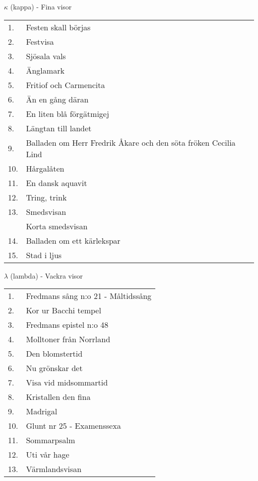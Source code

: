 \documentclass[a6paper,10pt]{article}
\begin{document}
\newpage
\noindent
\Large $\kappa$ (kappa) - Fina visor
\vspace{-5pt}
\begin{table}[!h]
\begin{tabularx}{1\textwidth}{l X}
1.&Festen skall börjas\\
2.&Festvisa\\
3.&Sjösala vals\\
4.&Änglamark\\
5.&Fritiof och Carmencita\\
6.&Än en gång däran\\
7.&En liten blå förgätmigej\\
8.&Längtan till landet\\
9.&Balladen om Herr Fredrik Åkare och den söta fröken Cecilia
Lind\\
10.&Hårgalåten\\
11.&En dansk aquavit\\
12.&Tring, trink\\
13.&Smedsvisan\\
&Korta smedsvisan\\
14.&Balladen om ett kärlekspar\\
15.&Stad i ljus
\end{tabularx}
\end{table}
\newpage
\noindent
\Large $\lambda$ (lambda) - Vackra visor
\vspace{-5pt}
\begin{table}[!h]
\begin{tabularx}{1\textwidth}{l X}
1.&Fredmans sång n:o 21 - Måltidssång\\
2.&Kor ur Bacchi tempel\\
3.&Fredmans epistel n:o 48\\
4.&Molltoner från Norrland\\
5.&Den blomstertid\\
6.&Nu grönskar det \\
7.&Visa vid midsommartid\\
8.&Kristallen den fina\\
9.&Madrigal\\
10.&Glunt nr 25 - Examenssexa\\
11.&Sommarpsalm\\
12.&Uti vår hage\\
13.&Värmlandsvisan
\end{tabularx}
\end{table}
\end{document}
